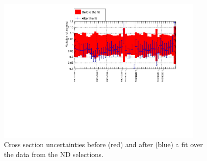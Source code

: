 \begin{figure}[ht]
  \begin{center}
    \includegraphics[width=0.9\textwidth,page=3]{images/BANFF/OutputData_histos.pdf}
    \caption[Cross section uncertainties before and after a fit over
    the data from the ND280 selections]{Cross section uncertainties
      before (red) and after (blue) a fit over the data from the
      \Gls{ND} selections.}
    \label{fig:dataxsec}
  \end{center}
\end{figure}

